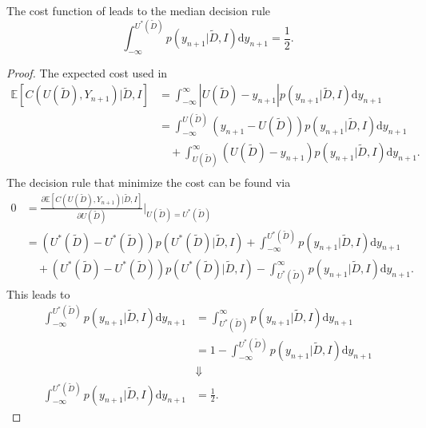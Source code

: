 \begin{theorem}
	\label{theorem:median_decision_rule}
	The cost function of  leads to the median decision rule
	\begin{equation}
		\int_{-\infty}^{U^*(\tilde{D})} p(y_{n+1}|\tilde{D},I)\mathrm{d}y_{n+1} = \frac{1}{2}.
	\end{equation}
\end{theorem}

\begin{proof}
	The expected cost used in 
	\begin{equation}
		\begin{split}
			\mathbb{E}[C(U(\tilde{D}), Y_{n+1})|\tilde{D},I] &= \int_{-\infty}^{\infty} |U(\tilde{D})-y_{n+1}| p(y_{n+1}|\tilde{D},I)\mathrm{d}y_{n+1}\\
			&= \int_{-\infty}^{U(\tilde{D})} (y_{n+1}-U(\tilde{D}))p(y_{n+1}|\tilde{D},I)\mathrm{d}y_{n+1}\\
			&\quad+\int_{U(\tilde{D})}^\infty  (U(\tilde{D})-y_{n+1})p(y_{n+1}|\tilde{D},I)\mathrm{d}y_{n+1}.\\
		\end{split}
	\end{equation}
	The decision rule that minimize the cost can be found via
	\begin{equation}
		\begin{split}
			0 &=\frac{\partial \mathbb{E}[C(U(\tilde{D}), Y_{n+1})|\tilde{D},I]}{\partial U(\tilde{D})}\bigg|_{U(\tilde{D})=U^*(\tilde{D})}\\
			&= (U^*(\tilde{D})-U^*(\tilde{D}))p(U^*(\tilde{D})|\tilde{D},I)+\int_{-\infty}^{U^*(\tilde{D})} p(y_{n+1}|\tilde{D},I)\mathrm{d}y_{n+1}\\
			&\quad+(U^*(\tilde{D})-U^*(\tilde{D}))p(U^*(\tilde{D})|\tilde{D},I)-\int_{U^*(\tilde{D})}^\infty  p(y_{n+1}|\tilde{D},I)\mathrm{d}y_{n+1}.
		\end{split}
	\end{equation}
	This leads to
	\begin{equation}
		\begin{split}
			\int_{-\infty}^{U^*(\tilde{D})} p(y_{n+1}|\tilde{D},I) \mathrm{d}y_{n+1} &= \int_{U^*(\tilde{D})}^\infty p(y_{n+1}|\tilde{D},I) \mathrm{d}y_{n+1}\\
			&= 1- \int_{-\infty}^{U^*(\tilde{D})} p(y_{n+1}|\tilde{D},I)\mathrm{d}y_{n+1}\\
			&\Downarrow\\
			\int_{-\infty}^{U^*(\tilde{D})} p(y_{n+1}|\tilde{D},I)\mathrm{d}y_{n+1}& = \frac{1}{2}.
		\end{split}
	\end{equation}	
\end{proof}

